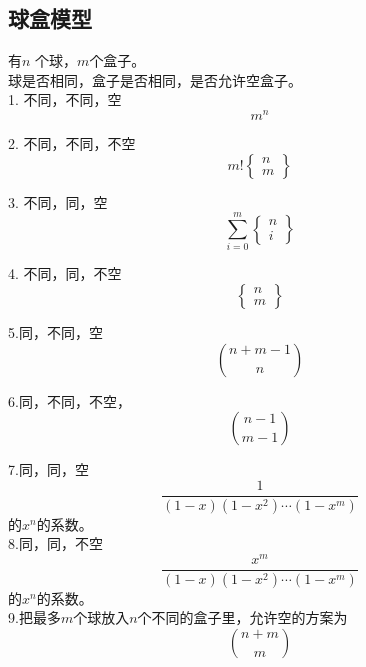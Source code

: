 \subsection{球盒模型}
有$n$ 个球，$m$个盒子。\\
球是否相同，盒子是否相同，是否允许空盒子。\\
1. 不同，不同，空
$$
m^n
$$

2. 不同，不同，不空
$$
m! \begin{Bmatrix}n \\ m\end{Bmatrix}
$$

3. 不同，同，空
$$
\sum_{i=0}^{m} \begin{Bmatrix}n \\ i\end{Bmatrix}
$$

4. 不同，同，不空
$$
\begin{Bmatrix}n \\ m\end{Bmatrix}
$$

5.同，不同，空
$$
\binom{n+m-1}{n}
$$

6.同，不同，不空，
$$
\binom{n-1}{m-1}
$$

7.同，同，空
$$
\frac{1}{(1-x)(1-x^2)\cdots (1-x^m)}
$$
的$x^n$的系数。\\

8.同，同，不空
$$
\frac{x^m}{(1-x)(1-x^2)\cdots (1-x^m)}
$$
的$x^n$的系数。\\

9.把最多$m$个球放入$n$个不同的盒子里，允许空的方案为
$$
\binom{n+m}{m}
$$
